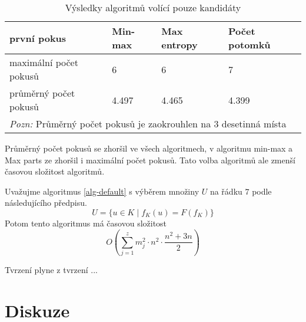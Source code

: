 \begin{table}[h]
\centering
\begin{tabular}{l l l l}
\toprule
první pokus & Min-max & Max entropy & Počet potomků  \\
\midrule

maximální počet pokusů 
& 6 & 6 & 7  \\

průměrný počet pokusů 
& 4.497 & 4.465 & 4.399 \\
\bottomrule
\multicolumn{4}{l}{\footnotesize \textit{Pozn:}
Průměrný počet pokusů je zaokrouhlen na $3$ desetinná místa}
\end{tabular}
\caption{Výsledky algoritmů volící pouze kandidáty}\label{tabminmaxvysl}
\end{table}

Průměrný počet pokusů se zhoršil ve všech algoritmech, v algoritmu min-max a Max parts ze zhoršil i maximální počet pokusů. Tato volba algoritmů ale zmenší časovou složitost algoritmů.

\begin{tvrz}
    Uvažujme algoritmus \ref{alg-default} s výběrem množiny $U$ na řádku $7$ podle následujícího předpisu.
    \[U = \{u \in K \mid f_K(u) = F(f_K)\}\]
    Potom tento algoritmus má časovou složitost 
     \[O \left( \sum_{j = 1}^z  m_j^2 \cdot n^2 \cdot \frac{n^2 + 3n}{2}\right)\]
\end{tvrz}
\begin{dukaz}
    Tvrzení plyne z tvrzení ...
\end{dukaz}


\section{Diskuze}



